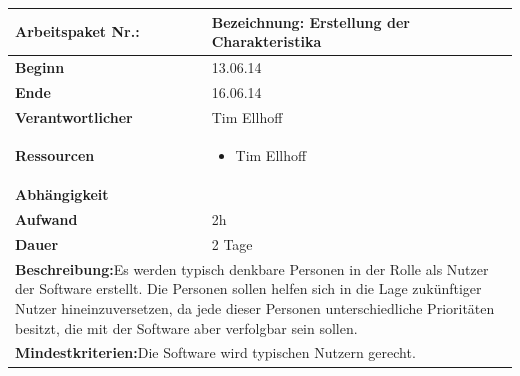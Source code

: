\documentclass[fontsize=12pt,paper=a4,twoside]{scrartcl}
\begin{document}
	\begin{verbatim} 
	\end{verbatim}
	
	\begin{tabular}{|p{5.3cm}|p{9.7cm}|}\hline
		\textbf{Arbeitspaket Nr.:}  & \textbf{Bezeichnung:} Erstellung der Charakteristika\\ \hline \hline
		\textbf{Beginn} & 13.06.14\\ \hline
		\textbf{Ende} & 16.06.14\\ \hline
		\textbf{Verantwortlicher} & Tim Ellhoff\\ \hline
		\textbf{Ressourcen} & \begin{itemize}
			\item Tim Ellhoff
		\end{itemize}    \\ \hline
		\textbf{Abhängigkeit} &\\ \hline
		\textbf{Aufwand} & 2h\\ \hline
		\textbf{Dauer} & 2 Tage\\ \hline
		\multicolumn{2}{|p{15cm}|}{\textbf{Beschreibung:}\newline Es werden typisch denkbare Personen in der Rolle als Nutzer der Software erstellt. Die Personen sollen helfen sich in die Lage zukünftiger Nutzer hineinzuversetzen, da jede dieser Personen unterschiedliche Prioritäten besitzt, die mit der Software aber verfolgbar sein sollen. }\\ \hline
		\multicolumn{2}{|p{15cm}|}{\textbf{Mindestkriterien:}\newline Die Software wird typischen Nutzern gerecht. }\\ \hline
	\end{tabular}
	
	\begin{verbatim} 
	\end{verbatim}
	
\end{document}
